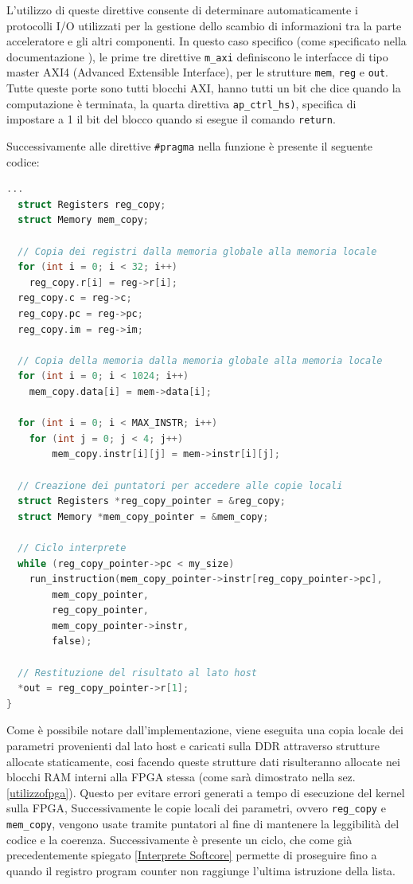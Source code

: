 L'utilizzo di queste direttive consente di determinare automaticamente i protocolli I/O utilizzati per la gestione dello scambio di informazioni tra la parte acceleratore e gli altri componenti. In questo caso specifico (come specificato nella documentazione \cite{sitoDocumentazionePragma}), le prime tre direttive \texttt{m\_axi} definiscono le interfacce di tipo master AXI4 (Advanced Extensible Interface), per le strutture \texttt{mem}, \texttt{reg} e \texttt{out}. Tutte queste porte sono tutti blocchi AXI, hanno tutti un bit che dice quando la computazione è terminata, la quarta direttiva \texttt{ap\_ctrl\_hs)}, specifica di impostare a 1 il bit del blocco quando si esegue il comando \texttt{return}.

\vspace{0.3cm}

Successivamente alle direttive \texttt{\#pragma} nella funzione è presente il seguente codice:
\begin{lstlisting}[language=C,caption={Funzione Interprete},label={funzioneinterprete}]
...
  struct Registers reg_copy;
  struct Memory mem_copy;
  
  // Copia dei registri dalla memoria globale alla memoria locale
  for (int i = 0; i < 32; i++)
    reg_copy.r[i] = reg->r[i];
  reg_copy.c = reg->c;
  reg_copy.pc = reg->pc;
  reg_copy.im = reg->im;

  // Copia della memoria dalla memoria globale alla memoria locale
  for (int i = 0; i < 1024; i++)
    mem_copy.data[i] = mem->data[i];

  for (int i = 0; i < MAX_INSTR; i++)
    for (int j = 0; j < 4; j++)
        mem_copy.instr[i][j] = mem->instr[i][j];
        
  // Creazione dei puntatori per accedere alle copie locali      
  struct Registers *reg_copy_pointer = &reg_copy;
  struct Memory *mem_copy_pointer = &mem_copy;

  // Ciclo interprete
  while (reg_copy_pointer->pc < my_size)
    run_instruction(mem_copy_pointer->instr[reg_copy_pointer->pc], 
        mem_copy_pointer, 
        reg_copy_pointer, 
        mem_copy_pointer->instr, 
        false);
        
  // Restituzione del risultato al lato host
  *out = reg_copy_pointer->r[1];
}
\end{lstlisting}
Come è possibile notare dall'implementazione, viene eseguita una copia locale dei parametri provenienti dal lato host e caricati sulla DDR attraverso strutture allocate staticamente, cosi facendo queste strutture dati risulteranno allocate nei blocchi RAM interni alla FPGA stessa (come sarà dimostrato nella sez. \ref{utilizzofpga}). Questo per evitare errori generati a tempo di esecuzione del kernel sulla FPGA, Successivamente le copie locali dei parametri, ovvero \texttt{reg\_copy} e \texttt{mem\_copy}, vengono usate tramite puntatori al fine di mantenere la leggibilità del codice e la coerenza. Successivamente è presente un ciclo, che come già precedentemente spiegato \ref{Interprete Softcore} permette  di proseguire fino a quando il registro program counter non raggiunge l’ultima istruzione della lista.

